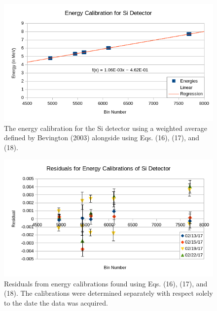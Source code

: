\documentclass[10pt]{IEEEtran}
\begin{document}
    \begin{figure}[!h]
        \begin{center}
        \includegraphics[width=\columnwidth]{energy.png}
       \caption{The energy calibration for the Si detector using a weighted average defined by Bevington (2003) alongside using Eqs. (16), (17), and (18).}
        \label{fig:energy}
        \end{center}
    \end{figure}
    
    \begin{figure}[!h]
        \begin{center}
        \includegraphics[width=\columnwidth]{energyresidual.png}
       \caption{Residuals from energy calibrations found using Eqs. (16), (17), and (18). The calibrations were determined separately with respect solely to the date the data was acquired.}
        \label{fig:energyres}
        \end{center}
    \end{figure}
\end{document}

